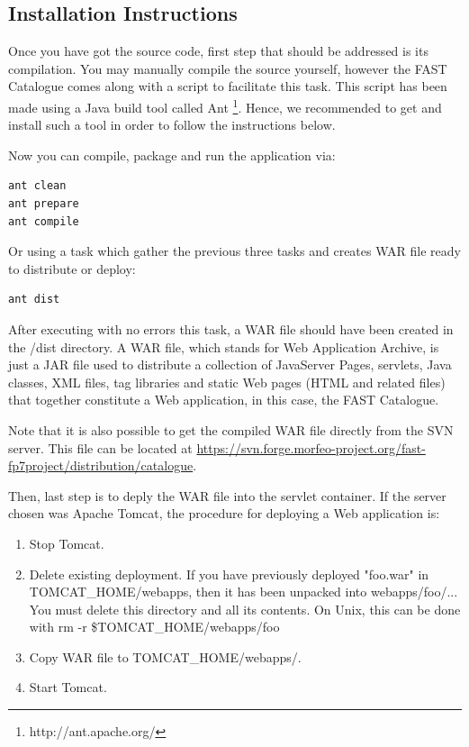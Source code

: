 \documentclass{fast_latex}
\begin{document}
\subsection{Installation Instructions} %
\label{sub:installation_instructions}

Once you have got the source code, first step that should be addressed is its compilation. You may manually compile the source yourself, however the FAST Catalogue comes along with a script to facilitate this task. This script has been made using a Java build tool called Ant \footnote{http://ant.apache.org/}. Hence, we recommended to get and install such a tool in order to follow the instructions below.

Now you can compile, package and run the application via:
\begin{verbatim}
ant clean
ant prepare
ant compile
\end{verbatim}

Or using a task which gather the previous three tasks and creates WAR file ready to distribute or deploy:
\begin{verbatim}
ant dist
\end{verbatim}

After executing with no errors this task, a WAR file should have been created in the /dist directory. A WAR file, which stands for  Web Application Archive, is just a JAR file used to distribute a collection of JavaServer Pages, servlets, Java classes, XML files, tag libraries and static Web pages (HTML and related files) that together constitute a Web application, in this case, the FAST Catalogue.

Note that it is also possible to get the compiled WAR file directly from the SVN server. This file can be located at \url{https://svn.forge.morfeo-project.org/fast-fp7project/distribution/catalogue}.

Then, last step is to deply the WAR file into the servlet container. If the server chosen was Apache Tomcat, the procedure for deploying a Web application is:
\begin{enumerate}
	\item Stop Tomcat.
	\item Delete existing deployment. If you have previously deployed "foo.war" in TOMCAT\_HOME/webapps, then it has been unpacked into webapps/foo/... You must delete this directory and all its contents. On Unix, this can be done with
rm -r \$TOMCAT\_HOME/webapps/foo
	\item Copy WAR file to TOMCAT\_HOME/webapps/.
	\item Start Tomcat.
\end{enumerate}
\end{document}
